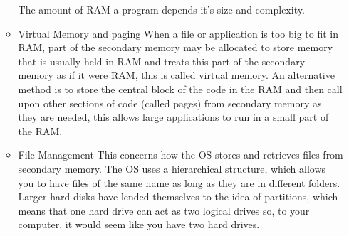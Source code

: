 \begin{itemize}
\begin{itemize}
        The amount of RAM a program depends it's size and complexity.
      \item Virtual Memory and paging
        \subitem When a file or application is too big to fit in RAM, part of the secondary memory may be allocated to store memory that is usually held in RAM and treats this part of the secondary memory as if it were RAM, this is called virtual memory. An alternative method is to store the central block of the code in the RAM and then call upon other sections of code (called pages) from secondary memory as they are needed, this allows large applications to run in a small part of the RAM.
      \item File Management
        \subitem This concerns how the OS stores and retrieves files from secondary memory. The OS uses a hierarchical structure, which allows you to have files of the same name as long as they are in different folders. Larger hard disks have lended themselves to the idea of partitions, which means that one hard drive can act as two logical drives so, to your computer, it would seem like you have two hard drives.
    \end{itemize}
  \end{itemize}

